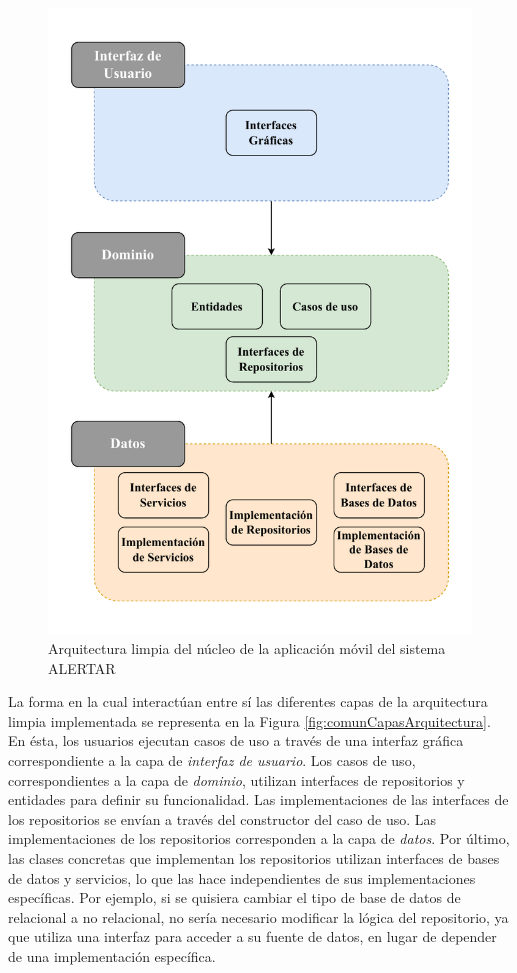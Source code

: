 \begin{figure}
    \centering
    \includegraphics[width=0.7\linewidth]{Imagenes/Implementacion/CapasArquitectura.pdf}
    \caption{Arquitectura limpia del núcleo de la aplicación móvil del sistema ALERTAR}
    \label{fig:capasArquitectura}
\end{figure}
La forma en la cual interactúan entre sí las diferentes capas de la arquitectura limpia implementada se representa en la Figura \ref{fig:comunCapasArquitectura}. En ésta, los usuarios ejecutan casos de uso a través de una interfaz gráfica correspondiente a la capa de \textit{interfaz de usuario}. Los casos de uso, correspondientes a la capa de \textit{dominio}, utilizan interfaces de repositorios y entidades para definir su funcionalidad. Las implementaciones de las interfaces de los repositorios se envían a través del constructor del caso de uso. Las implementaciones de los repositorios corresponden a la capa de \textit{datos}. Por último, las clases concretas que implementan los repositorios utilizan interfaces de bases de datos y servicios, lo que las hace independientes de sus implementaciones específicas. Por ejemplo, si se quisiera cambiar el tipo de base de datos de relacional a no relacional, no sería necesario modificar la lógica del repositorio, ya que utiliza una interfaz para acceder a su fuente de datos, en lugar de depender de una implementación específica.


